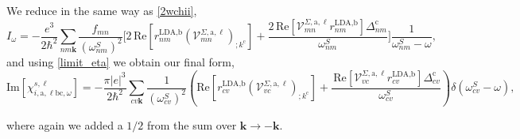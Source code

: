 We reduce in the same way as \eqref{2wchii}, 
\begin{equation}\label{wchii_simplified}
I_{\omega}
=   -\frac{e^3}{2\hbar^2}\sum_{nm\mathbf{k}}
    \frac{f_{mn}}{(\omega^{S}_{nm})^{2}}
\Biggl[
    2\,\mathrm{Re}\left[r^{\text{LDA,b}}_{nm}
    \left(\mathcal{V}^{\Sigma,\text{a},\ell}_{mn}\right)_{;k^{\text{c}}}\right]
+   \frac{2\,\mathrm{Re}\left[\mathcal{V}^{\Sigma,\text{a},\ell}_{mn}
    r^{\text{LDA,b}}_{nm}\right]\Delta^{\text{c}}_{nm}}{\omega^{S}_{nm}} 
\Biggr]\frac{1}{\omega^{S}_{nm}-\omega}
,
\end{equation}
and using \eqref{limit_eta} we obtain our final form,
\begin{equation}
\mathrm{Im}[\chi_{i,\text{a},\ell\text{b}\text{c},\omega}^{s,\ell}]
=   -\frac{\pi\vert e\vert^3}{2\hbar^2}
    \sum_{cv\mathbf{k}}\frac{1}{(\omega^{S}_{cv})^{2}}
\left(
    \mathrm{Re}\left[r^{\text{LDA,b}}_{cv}
    \left(\mathcal{V}^{\Sigma,\text{a},\ell}_{vc}\right)_{;k^{\text{c}}}\right]
+   \frac{\,\mathrm{Re}\left[\mathcal{V}^{\Sigma,\text{a},\ell}_{vc}
    r^{\text{LDA,b}}_{cv}\right]\Delta^{\text{c}}_{cv}}{\omega^{S}_{cv}} 
\right)\delta(\omega^{S}_{cv}-\omega)
,
\end{equation}

where again we added a $1/2$ from the sum over 
$\mathbf{k} \rightarrow - \mathbf{k}$.
